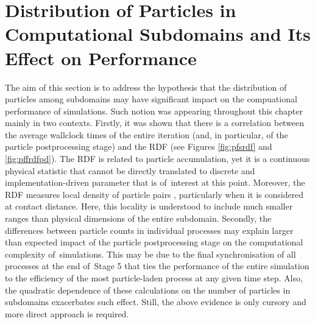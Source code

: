 \documentclass{pracamgren}
\begin{document}
 

\section{Distribution of Particles in Computational Subdomains and Its Effect on Performance}
\label{sc:ch3.perfp}


The aim of this section is to address the hypothesis that the distribution of particles among subdomains may have significant impact on the compuational performance of simulations.
Such notion was appearing throughout this chapter mainly in two contexts.
Firstly, it was shown that there is a correlation between the average wallclock times of the entire iteration (and, in particular, of the particle postprocessing stage) and the RDF (see Figures \ref{fig:pfsrdf} and \ref{fig:pffrdfpd}).
The RDF is related to particle accumulation, yet it is a continuous physical statistic that cannot be directly translated to discrete and implementation-driven parameter that is of~interest at this point.
Moreover, the RDF measures local density of particle pairs \parencite{Grabowski2013}, particularly when it is considered at contact distance.
Here, this locality is understood to include much smaller ranges than physical dimensions of the entire subdomain.   
Secondly, the differences between particle counts in individual processes may explain larger than expected impact of the particle postprocessing stage on the computational complexity of~simulations.
This may be due to the final synchronisation of all processes at the end of~Stage 5 that ties the performance of the entire simulation to the efficiency of the most particle-laden process at any given time step.
Also, the quadratic dependence of these calculations on the number of particles in subdomains exacerbates such effect.
Still, the above evidence is only cursory and more direct approach is required.
\end{document}
